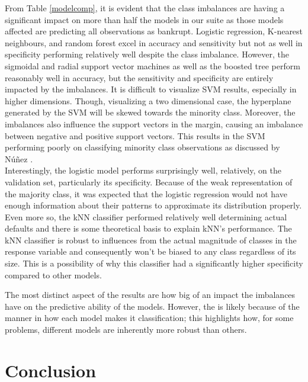 \documentclass[12pt]{report}
\begin{document}
From Table \ref{modelcomp}, it is evident that the class imbalances are having a significant impact on more than half the models in our suite as those models affected are predicting all observations as bankrupt. Logistic regression, K-nearest neighbours, and random forest excel in accuracy and sensitivity but not as well in specificity performing relatively well despite the class imbalance. However, the sigmoidal and radial support vector machines as well as the boosted tree perform reasonably well in accuracy, but the sensitivity and specificity are entirely impacted by the imbalances. It is difficult to visualize SVM results, especially in higher dimensions. Though, visualizing a two dimensional case, the hyperplane generated by the SVM will be skewed towards the minority class. Moreover, the imbalances also influence the support vectors in the margin, causing an imbalance between negative and positive support vectors. This results in the SVM performing poorly on classifying minority class observations as discussed by Núñez \cite{SVM}. \\
\indent Interestingly, the logistic model performs surprisingly well, relatively, on the validation set, particularly its specificity. Because of the weak representation of the majority class, it was expected that the logistic regression would not have enough information about their patterns to approximate its distribution properly. Even more so, the kNN classifier performed relatively well determining actual defaults and there is some theoretical basis to explain kNN's performance. The kNN classifier is robust to influences from the actual magnitude of classes in the response variable and consequently won't be biased to any class regardless of its size. This is a possibility of why this classifier had a significantly higher specificity compared to other models.  

The most distinct aspect of the results are how big of an impact the imbalances have on the predictive ability of the models. However, the is likely because of the manner in how each model makes it classification; this highlights how, for some problems, different models are inherently more robust than others. 

\section{Conclusion}
\end{document}
